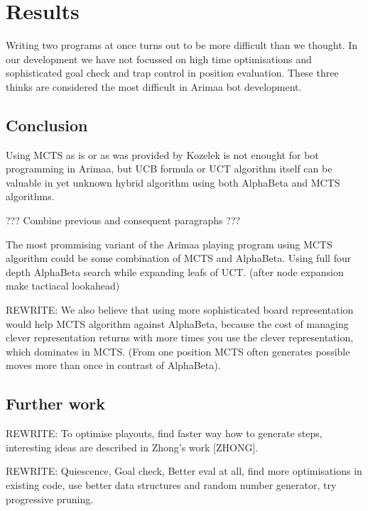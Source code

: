 
\chapter{Results}
Writing two programs at once turns out to be more difficult than we thought. In
our development we have not focussed on high time optimisations and
sophisticated goal check and trap control in position evaluation. These three
thinks are considered the most difficult in Arimaa bot development.

\section{Conclusion}
Using MCTS as is or as was provided by Kozelek is not enought for bot
programming in Arimaa, but UCB formula or UCT algorithm itself can be valuable
in yet unknown hybrid algorithm using both AlphaBeta and MCTS algorithms.

??? Combine previous and consequent paragraphs ???

The most prommising variant of the Arimaa playing program using MCTS algorithm
could be some combination of MCTS and AlphaBeta. Using full four depth
AlphaBeta search while expanding leafs of UCT. (after node expansion make
tactiacal lookahead)

REWRITE: We also believe that using more sophisticated board representation
would help MCTS algorithm against AlphaBeta, because the cost of managing
clever representation returns with more times you use the clever
representation, which dominates in MCTS. (From one position MCTS often
generates possible moves more than once in contrast of AlphaBeta).

\section{Further work}
REWRITE: To optimise playouts, find faster way how to generate steps,
interesting ideas are described in Zhong's work [ZHONG].

REWRITE: Quiescence, Goal check, Better eval at all, find more optimisations in
existing code, use better data structures and random number generator, try
progressive pruning.
